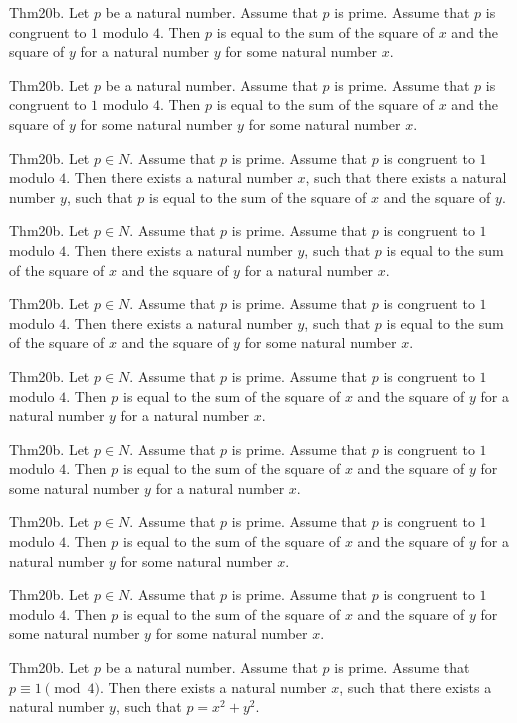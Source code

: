 \documentclass{article}
\begin{document}
Thm20b. Let $p$ be a natural number. Assume that $p$ is prime. Assume that $p$ is congruent to $1$ modulo $4$. Then $p$ is equal to the sum of the square of $x$ and the square of $y$ for a natural number $y$ for some natural number $x$.

Thm20b. Let $p$ be a natural number. Assume that $p$ is prime. Assume that $p$ is congruent to $1$ modulo $4$. Then $p$ is equal to the sum of the square of $x$ and the square of $y$ for some natural number $y$ for some natural number $x$.

Thm20b. Let $p \in N$. Assume that $p$ is prime. Assume that $p$ is congruent to $1$ modulo $4$. Then there exists a natural number $x$, such that there exists a natural number $y$, such that $p$ is equal to the sum of the square of $x$ and the square of $y$.

Thm20b. Let $p \in N$. Assume that $p$ is prime. Assume that $p$ is congruent to $1$ modulo $4$. Then there exists a natural number $y$, such that $p$ is equal to the sum of the square of $x$ and the square of $y$ for a natural number $x$.

Thm20b. Let $p \in N$. Assume that $p$ is prime. Assume that $p$ is congruent to $1$ modulo $4$. Then there exists a natural number $y$, such that $p$ is equal to the sum of the square of $x$ and the square of $y$ for some natural number $x$.

Thm20b. Let $p \in N$. Assume that $p$ is prime. Assume that $p$ is congruent to $1$ modulo $4$. Then $p$ is equal to the sum of the square of $x$ and the square of $y$ for a natural number $y$ for a natural number $x$.

Thm20b. Let $p \in N$. Assume that $p$ is prime. Assume that $p$ is congruent to $1$ modulo $4$. Then $p$ is equal to the sum of the square of $x$ and the square of $y$ for some natural number $y$ for a natural number $x$.

Thm20b. Let $p \in N$. Assume that $p$ is prime. Assume that $p$ is congruent to $1$ modulo $4$. Then $p$ is equal to the sum of the square of $x$ and the square of $y$ for a natural number $y$ for some natural number $x$.

Thm20b. Let $p \in N$. Assume that $p$ is prime. Assume that $p$ is congruent to $1$ modulo $4$. Then $p$ is equal to the sum of the square of $x$ and the square of $y$ for some natural number $y$ for some natural number $x$.

Thm20b. Let $p$ be a natural number. Assume that $p$ is prime. Assume that $p \equiv 1 \pmod{ 4}$. Then there exists a natural number $x$, such that there exists a natural number $y$, such that $p = x ^{ 2}+ y ^{ 2}$.
\end{document}
